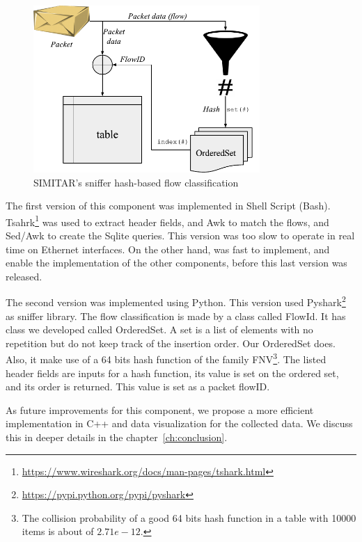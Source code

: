 \begin{figure}[ht!]
        \centering
        \includegraphics[height=2.5in]{figures/ch3/sniffer-classifier}
        \caption{SIMITAR's sniffer hash-based flow classification}
    \label{fig:sniffer}
\end{figure}


The first version of this component was implemented in Shell Script (Bash).  Tsahrk\footnote{\href{https://www.wireshark.org/docs/man-pages/tshark.html}{https://www.wireshark.org/docs/man-pages/tshark.html}} was used to extract header fields, and Awk to match the flows, and Sed/Awk to create the Sqlite queries. This version was too slow to operate in real time on Ethernet interfaces. On the other hand, was fast to implement, and enable the implementation of the other components, before this last version was released.


The second version was implemented using Python. This version used Pyshark\footnote{\href{https://pypi.python.org/pypi/pyshark}{https://pypi.python.org/pypi/pyshark}} as sniffer library. The flow classification is made by a class called FlowId. It has class we developed called OrderedSet. A set is a list of elements with no repetition but do not keep track of the insertion order. Our OrderedSet does. Also, it make use of a  64 bits hash function of the family FNV\footnote{The collision probability of a good 64 bits hash function in a table with 10000 items is about of $2.71e-12$.}. The listed header fields are inputs for a hash function, its value is set on the ordered set, and its order is returned. This value is set as a packet flowID.  

As future improvements for this component, we propose a more efficient implementation in C++ and data visualization for the collected data. We discuss this in deeper details in the chapter~\ref{ch:conclusion}.




